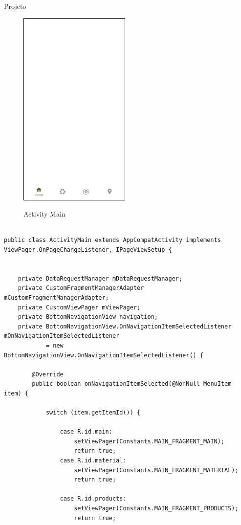 \documentclass[
	12pt,				%
	openright,			%
	twoside,			%
	a4paper,			%
	english,			%
	french,				%
	spanish,			%
	brazil				%
	]{abntex2}
\begin{document}
\begin{chapter}{Projeto}
\newpage

\begin{figure}[h]
\centering
   \caption{Activity Main}
   \includegraphics[scale=1.0]{media/activity_main.png}
     \label{fig:activity_main_app}
\end{figure}


\begin{lstlisting}[numbers=none,
basicstyle=\small,
caption={MainActivity.java},
title={MainActivity.java},
label={MainActivity.java}]

public class ActivityMain extends AppCompatActivity implements ViewPager.OnPageChangeListener, IPageViewSetup {


    private DataRequestManager mDataRequestManager;
    private CustomFragmentManagerAdapter mCustomFragmentManagerAdapter;
    private CustomViewPager mViewPager;
    private BottomNavigationView navigation;
    private BottomNavigationView.OnNavigationItemSelectedListener mOnNavigationItemSelectedListener
            = new BottomNavigationView.OnNavigationItemSelectedListener() {

        @Override
        public boolean onNavigationItemSelected(@NonNull MenuItem item) {

            switch (item.getItemId()) {

                case R.id.main:
                    setViewPager(Constants.MAIN_FRAGMENT_MAIN);
                    return true;
                case R.id.material:
                    setViewPager(Constants.MAIN_FRAGMENT_MATERIAL);
                    return true;

                case R.id.products:
                    setViewPager(Constants.MAIN_FRAGMENT_PRODUCTS);
                    return true;


\end{lstlisting}
\end{chapter}
\end{document}
